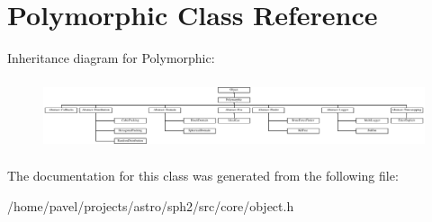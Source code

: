 \hypertarget{classPolymorphic}{}\section{Polymorphic Class Reference}
\label{classPolymorphic}
Inheritance diagram for Polymorphic\+:\begin{figure}[H]
\begin{center}
\leavevmode
\includegraphics[height=2.092154cm]{classPolymorphic}
\end{center}
\end{figure}


The documentation for this class was generated from the following file\+:\begin{DoxyCompactItemize}
\item 
/home/pavel/projects/astro/sph2/src/core/object.\+h\end{DoxyCompactItemize}
